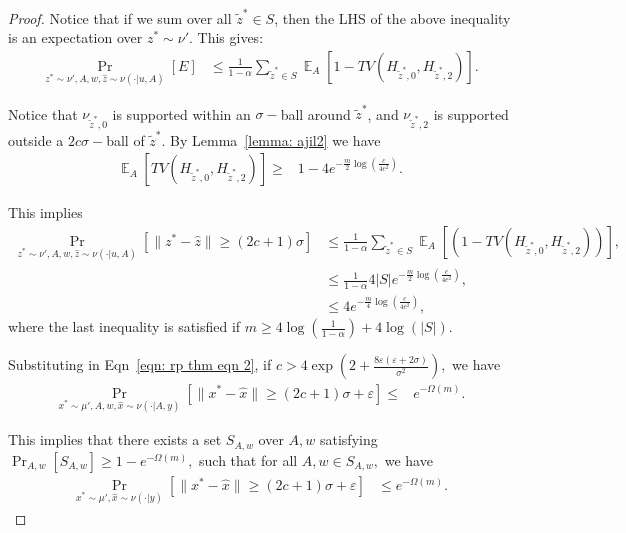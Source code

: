 \documentclass{article}
\newcommand{\norm}[1]{\|#1\|}
\newcommand{\wh}{\widehat}
\newcommand{\eps}{\varepsilon}
\DeclareMathOperator*{\E}{\mathbb{E}}
\begin{document}
\begin{proof}
	Notice that if we sum over all $\tilde{z}^* \in S $, then the LHS
	of the above inequality is an expectation over $z^* \sim \nu'$. This
	gives:
    \begin{align*} 
      \Pr_{z^* \sim \nu', A , w, \widehat{z} \sim \nu(\cdot | u,A)} \left[ E \right] & \leq \frac{1}{1-\alpha} \sum_{\tilde{z}^* \in S} \E_{A} \left[ 1 - TV(H_{\tilde{z}^*, 0}, H_{\tilde{z}^*,2}) \right].
    \end{align*}

    Notice that $\nu_{\tilde{z}^*,0}$ is supported within an $\sigma-$ball around $\tilde{z}^*$, and $\nu_{\tilde{z}^*,2}$ is supported outside a $2c\sigma-$ball of $\tilde{z}^*$. By Lemma~\ref{lemma: ajil2} we have 
    \begin{align*}
			\E_A [TV(H_{\tilde{z}^*,0}, H_{\tilde{z}^*,2})] \geq & 1 - 4 e^{-\frac{m}{2}\log\left( \frac{c}{4e^2} \right)}.
    \end{align*}

    This implies 
    \begin{align*}
      \Pr_{z^*\sim \nu', A, w, \widehat{z} \sim \nu( \cdot | u, A )}\left[\norm{ z^* - \wh{z} } \geq (2c+1)\sigma \right] & \leq  \frac{1}{1-\alpha} \sum_{\tilde{z}^*\in S} \E_A \left[ ( 1 - TV(H_{\tilde{z}^*, 0}, H_{\tilde{z}^*,2})) \right], \\
      & \leq \frac{1}{1-\alpha}4 |S|  e^{-\frac{m}{2}\log\left( \frac{c}{4e^2} \right)},\\
			& \leq 4 e^{-\frac{m}{4}\log\left( \frac{c}{4e^2} \right)},
    \end{align*}
		where the last inequality is satisfied if $m \geq 4 \log\left(\frac{1}{1-\alpha}\right) + 4\log\left(|S|\right).$

		Substituting in Eqn~\eqref{eqn: rp thm eqn 2}, if $c > 4 \exp{\left( 2+  \frac{8\eps\left( \eps + 2\sigma \right)}{\sigma^2} \right)},$ we have
		\begin{align*}
		  \Pr_{x^*\sim \mu' , A , w, \widehat{x} \sim \nu( \cdot | A, y)} \left[ \norm{x^* - \widehat{x}} \geq \left( 2c + 1 \right)\sigma + \eps  \right] \leq & e^{-\Omega(m)}.
		\end{align*}


		This implies that there exists a set $S_{A,w}$ over $A,w$ satisfying $\Pr_{A,w}[S_{A,w}] \geq 1 - e^{-\Omega(m)},$ such that for all $A , w \in S_{A, w},$ we have
		\begin{align*}
		  \Pr_{x^*\sim \mu', \widehat{x} \sim \nu( \cdot | y)}\left[\norm{ x^* - \wh{x} } \geq (2c+1)\sigma + \eps \right] & \leq  e^{-\Omega(m)}.
		\end{align*}


\end{proof}
\end{document}
